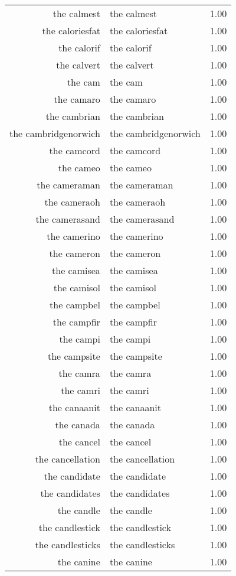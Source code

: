 \begin{table}[ht]
\begin{tabular}{rlr}
  the calmest & the calmest & 1.00 \\ 
  the caloriesfat & the caloriesfat & 1.00 \\ 
  the calorif & the calorif & 1.00 \\ 
  the calvert & the calvert & 1.00 \\ 
  the cam & the cam & 1.00 \\ 
  the camaro & the camaro & 1.00 \\ 
  the cambrian & the cambrian & 1.00 \\ 
  the cambridgenorwich & the cambridgenorwich & 1.00 \\ 
  the camcord & the camcord & 1.00 \\ 
  the cameo & the cameo & 1.00 \\ 
  the cameraman & the cameraman & 1.00 \\ 
  the cameraoh & the cameraoh & 1.00 \\ 
  the camerasand & the camerasand & 1.00 \\ 
  the camerino & the camerino & 1.00 \\ 
  the cameron & the cameron & 1.00 \\ 
  the camisea & the camisea & 1.00 \\ 
  the camisol & the camisol & 1.00 \\ 
  the campbel & the campbel & 1.00 \\ 
  the campfir & the campfir & 1.00 \\ 
  the campi & the campi & 1.00 \\ 
  the campsite & the campsite & 1.00 \\ 
  the camra & the camra & 1.00 \\ 
  the camri & the camri & 1.00 \\ 
  the canaanit & the canaanit & 1.00 \\ 
  the canada & the canada & 1.00 \\ 
  the cancel & the cancel & 1.00 \\ 
  the cancellation & the cancellation & 1.00 \\ 
  the candidate & the candidate & 1.00 \\ 
  the candidates & the candidates & 1.00 \\ 
  the candle & the candle & 1.00 \\ 
  the candlestick & the candlestick & 1.00 \\ 
  the candlesticks & the candlesticks & 1.00 \\ 
  the canine & the canine & 1.00 \\ 

\end{tabular}
\end{table}
